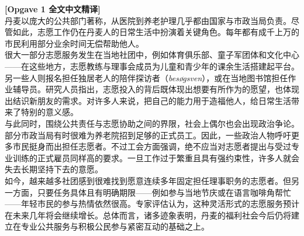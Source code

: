 \begin{transbox}
\small
\textbf{\color{NCDTeal}[Opgave 1 全文中文精译]}\\
丹麦以庞大的公共部门著称，从医院到养老护理几乎都由国家与市政当局负责。尽管如此，志愿工作仍在丹麦人的日常生活中扮演着关键角色。每年都有成千上万的市民利用部分业余时间无偿帮助他人。\\[3pt]
很大一部分志愿服务发生在当地社团中，例如体育俱乐部、童子军团体和文化中心——在这些地方，志愿教练与理事会成员为儿童和青少年的课余生活搭建起平台。另一些人则报名担任独居老人的陪伴探访者（\textit{besøgsven}），或在当地图书馆担任作业辅导员。研究人员指出，志愿投入的背后既体现出想要有所作为的愿望，也体现出结识新朋友的需求。对许多人来说，把自己的能力用于造福他人，给日常生活带来了特别的意义感。\\[3pt]
与此同时，围绕公共责任与志愿协助之间的界限，社会上偶尔也会出现政治争论。部分市政当局有时很难为养老院招到足够的正式员工。因此，一些政治人物呼吁更多市民挺身而出担任志愿者。不过工会方面强调，绝不应当对志愿者提出与受过专业训练的正式雇员同样高的要求。一旦工作过于繁重且具有强约束性，许多人就会失去长期坚持下去的意愿。\\[3pt]
如今，越来越多社团感到很难找到愿意连续多年固定担任理事职务的志愿者。但另一方面，只要任务具体且有明确期限——例如参与当地节庆或在语言咖啡角帮忙——年轻市民的参与热情依然很高。专家评估认为，这种灵活形式的志愿服务预计在未来几年将会继续增长。总体而言，诸多迹象表明，丹麦的福利社会今后仍将建立在专业公共服务与积极公民参与紧密互动的基础之上。
\end{transbox}

